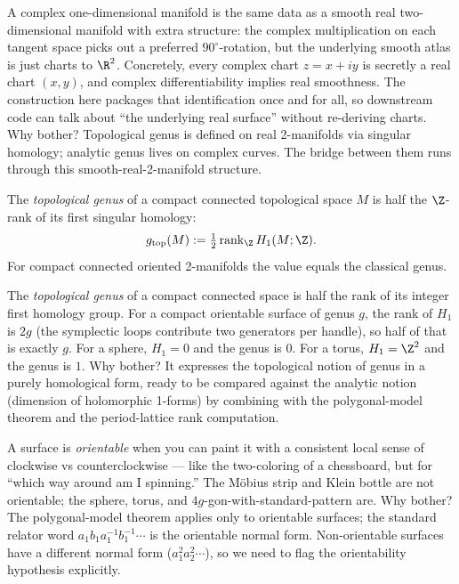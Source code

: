 \begin{layman}
A complex one-dimensional manifold is the same data as a smooth
real two-dimensional manifold with extra structure: the complex
multiplication on each tangent space picks out a preferred
\(90^{\circ}\)-rotation, but the underlying smooth atlas is just
charts to \(\R^2\). Concretely, every complex chart \(z=x+iy\) is
secretly a real chart \((x,y)\), and complex differentiability
implies real smoothness. The construction here packages that
identification once and for all, so downstream code can talk about
``the underlying real surface'' without re-deriving charts. Why
bother? Topological genus is defined on real 2-manifolds via
singular homology; analytic genus lives on complex curves. The
bridge between them runs through this smooth-real-2-manifold
structure.
\end{layman}

\begin{definition}
\label{def:topological-genus}
The \emph{topological genus} of a compact connected topological
space \(M\) is half the \(\Z\)-rank of its first singular homology:
\[
  g_{\mathrm{top}}(M) := \tfrac{1}{2}\,\mathrm{rank}_{\Z}\,H_1(M;\Z).
\]
For compact connected oriented 2-manifolds the value equals the
classical genus.
\leanok
\end{definition}

\begin{layman}
The \emph{topological genus} of a compact connected space is half
the rank of its integer first homology group. For a compact
orientable surface of genus \(g\), the rank of \(H_1\) is \(2g\)
(the symplectic loops contribute two generators per handle), so
half of that is exactly \(g\). For a sphere, \(H_1 = 0\) and the
genus is \(0\). For a torus, \(H_1 = \Z^2\) and the genus is \(1\).
Why bother? It expresses the topological notion of genus in a
purely homological form, ready to be compared against the analytic
notion (dimension of holomorphic 1-forms) by combining with the
polygonal-model theorem and the period-lattice rank computation.
\end{layman}





\begin{layman}
A surface is \emph{orientable} when you can paint it with a
consistent local sense of clockwise vs counterclockwise --- like the
two-coloring of a chessboard, but for ``which way around am I
spinning.'' The M\"obius strip and Klein bottle are not orientable;
the sphere, torus, and \(4g\)-gon-with-standard-pattern are. Why
bother? The polygonal-model theorem applies only to orientable
surfaces; the standard relator word \(a_1b_1a_1^{-1}b_1^{-1}\cdots\)
is the orientable normal form. Non-orientable surfaces have a
different normal form (\(a_1^2 a_2^2 \cdots\)), so we need to flag
the orientability hypothesis explicitly.
\end{layman}



